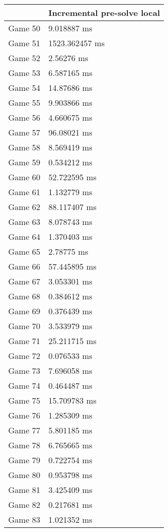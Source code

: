 \begin{tabular}{|l|l|}
	\hline
	& Incremental pre-solve local \\ \hline
	Game 50 & 9.018887 ms \\ \hline
	Game 51 & 1523.362457 ms \\ \hline
	Game 52 & 2.56276 ms \\ \hline
	Game 53 & 6.587165 ms \\ \hline
	Game 54 & 14.87686 ms \\ \hline
	Game 55 & 9.903866 ms \\ \hline
	Game 56 & 4.660675 ms \\ \hline
	Game 57 & 96.08021 ms \\ \hline
	Game 58 & 8.569419 ms \\ \hline
	Game 59 & 0.534212 ms \\ \hline
	Game 60 & 52.722595 ms \\ \hline
	Game 61 & 1.132779 ms \\ \hline
	Game 62 & 88.117407 ms \\ \hline
	Game 63 & 8.078743 ms \\ \hline
	Game 64 & 1.370403 ms \\ \hline
	Game 65 & 2.78775 ms \\ \hline
	Game 66 & 57.445895 ms \\ \hline
	Game 67 & 3.053301 ms \\ \hline
	Game 68 & 0.384612 ms \\ \hline
	Game 69 & 0.376439 ms \\ \hline
	Game 70 & 3.533979 ms \\ \hline
	Game 71 & 25.211715 ms \\ \hline
	Game 72 & 0.076533 ms \\ \hline
	Game 73 & 7.696058 ms \\ \hline
	Game 74 & 0.464487 ms \\ \hline
	Game 75 & 15.709783 ms \\ \hline
	Game 76 & 1.285309 ms \\ \hline
	Game 77 & 5.801185 ms \\ \hline
	Game 78 & 6.765665 ms \\ \hline
	Game 79 & 0.722754 ms \\ \hline
	Game 80 & 0.953798 ms \\ \hline
	Game 81 & 3.425409 ms \\ \hline
	Game 82 & 0.217681 ms \\ \hline
	Game 83 & 1.021352 ms \\ \hline

\end{tabular}

